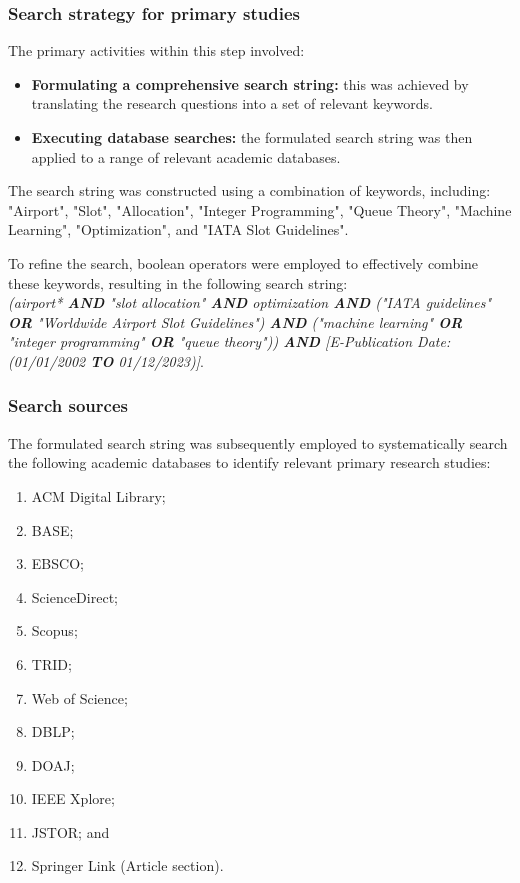 \subsubsection{Search strategy for primary studies}

The primary activities within this step involved:

\begin{itemize}
    \item \textbf{Formulating a comprehensive search string:} this was achieved
	    by translating the research questions into a set of relevant
		keywords.
    \item \textbf{Executing database searches:} the formulated search string was
	    then applied to a range of relevant academic databases.
\end{itemize}



The search string was constructed using a combination of keywords, including:
"Airport", "Slot", "Allocation", "Integer Programming", "Queue Theory", "Machine
Learning", "Optimization", and "IATA Slot Guidelines".



To refine the search, boolean operators were employed to effectively combine
these keywords, resulting in the following search string:
\\

\textit{(airport* \textbf{AND} "slot allocation" \textbf{AND}
 optimization \textbf{AND} ("IATA guidelines" \textbf{OR} "Worldwide Airport Slot Guidelines") \textbf{AND} ("machine learning" \textbf{OR} "integer programming" \textbf{OR} "queue theory")) \textbf{AND} [E-Publication Date: (01/01/2002 \textbf{TO} 01/12/2023)]}. 
\\




\subsubsection{Search sources}

The formulated search string was subsequently employed to systematically search
the following academic databases to identify relevant primary research studies:
\begin{enumerate}
    \item ACM Digital Library;
    \item \acrfull{BASE};
    \item EBSCO;
    \item ScienceDirect;
    \item Scopus;
    \item \acrfull{TRID};
    \item Web of Science;
    \item \acrfull{DBLP};
    \item \acrfull{DOAJ};
    \item IEEE Xplore;
    \item JSTOR; and
    \item Springer Link (Article section).
\end{enumerate}


